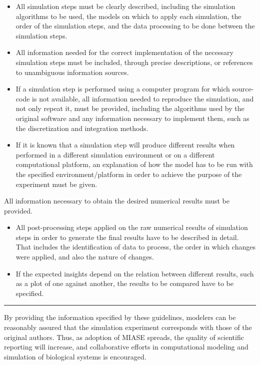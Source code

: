 \begin{itemize}
\item
  All simulation steps must be clearly described, including the
  simulation algorithms to be used, the models on which to apply each
  simulation, the order of the simulation steps, and the data processing
  to be done between the simulation steps.
\item
  All information needed for the correct implementation of the necessary
  simulation steps must be included, through precise descriptions, or
  references to unambiguous information sources.
\item
  If a simulation step is performed using a computer program for which
  source-code is not available, all information needed to reproduce the
  simulation, and not only repeat it, must be provided, including the
  algorithms used by the original software and any information necessary
  to implement them, such as the discretization and integration methods.
\item
  If it is known that a simulation step will produce different results
  when performed in a different simulation environment or on a different
  computational platform, an explanation of how the model has to be run
  with the specified environment/platform in order to achieve the
  purpose of the experiment must be given.
\end{itemize}
All information necessary to obtain the desired numerical results must
be provided.

\begin{itemize}
\item
  All post-processing steps applied on the raw numerical results of
  simulation steps in order to generate the final results have to be
  described in detail. That includes the identification of data to
  process, the order in which changes were applied, and also the nature
  of changes.
\item
  If the expected insights depend on the relation between different
  results, such as a plot of one against another, the results to be
  compared have to be specified.
\end{itemize}
\begin{center}\rule{3in}{0.4pt}\end{center}

By providing the information specified by these guidelines, modelers can
be reasonably assured that the simulation experiment corresponds with
those of the original authors. Thus, as adoption of MIASE spreads, the
quality of scientific reporting will increase, and collaborative efforts
in computational modeling and simulation of biological systems is
encouraged.

